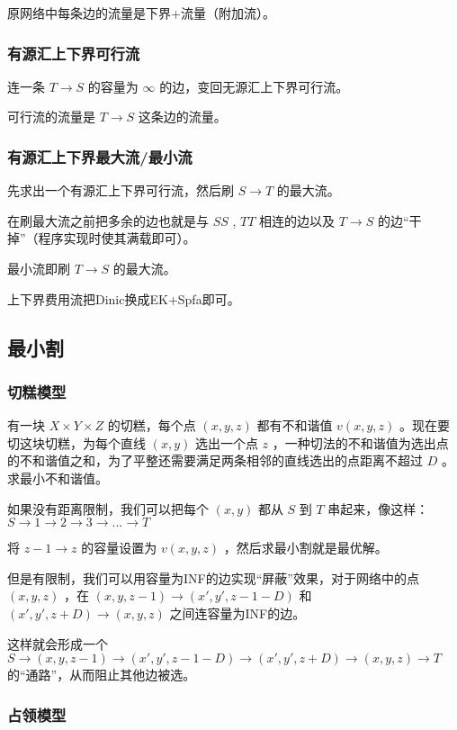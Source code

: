 原网络中每条边的流量是下界+流量（附加流）。

\subsubsection{有源汇上下界可行流}

连一条 $T\to S$ 的容量为 $∞$ 的边，变回无源汇上下界可行流。

可行流的流量是 $T\to S$ 这条边的流量。

\subsubsection{有源汇上下界最大流/最小流}

先求出一个有源汇上下界可行流，然后刷 $S\to T$ 的最大流。

在刷最大流之前把多余的边也就是与 $SS$ , $TT$ 相连的边以及 $T\to S$ 的边“干掉”（程序实现时使其满载即可）。

最小流即刷 $T\to S$ 的最大流。

上下界费用流把Dinic换成EK+Spfa即可。



\subsection{最小割}

\subsubsection{切糕模型}

有一块 $X\times Y\times Z$ 的切糕，每个点 $(x,y,z)$ 都有不和谐值 $v(x,y,z)$ 。现在要切这块切糕，为每个直线 $(x,y)$ 选出一个点 $z$ ，一种切法的不和谐值为选出点的不和谐值之和，为了平整还需要满足两条相邻的直线选出的点距离不超过 $D$ 。求最小不和谐值。

如果没有距离限制，我们可以把每个 $(x,y)$ 都从 $S$ 到 $T$ 串起来，像这样：$S \to 1 \to 2 \to 3 \to ... \to T$

将 $z-1\to z$ 的容量设置为 $v(x,y,z)$ ，然后求最小割就是最优解。

但是有限制，我们可以用容量为INF的边实现“屏蔽”效果，对于网络中的点 $(x,y,z)$ ，在 $(x,y,z-1)\to (x',y',z-1-D)$ 和 $(x',y',z+D)\to (x,y,z)$ 之间连容量为INF的边。

这样就会形成一个 $S\to (x,y,z-1)\to (x',y',z-1-D)\to (x',y',z+D)\to (x,y,z)\to T$ 的“通路”，从而阻止其他边被选。 

\subsubsection{占领模型}

